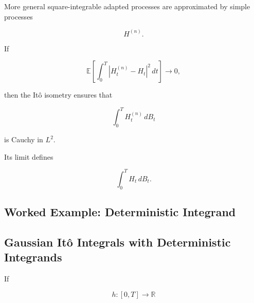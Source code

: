 More general square-integrable adapted processes are approximated by
simple processes

\[
H^{(n)}.
\]

If

\[
\mathbb{E}
\left[
\int_0^T
|H_t^{(n)}-H_t|^2\,dt
\right]
\to0,
\]

then the It\^o isometry ensures that

\[
\int_0^T
H_t^{(n)}\,dB_t
\]

is Cauchy in \(L^2\).

Its limit defines

\[
\boxed{
\int_0^T
H_t\,dB_t.
}
\]

\subsection{Worked Example: Deterministic Integrand}
\label{subsec:worked-deterministic-ito}


\subsection{Gaussian It\^o Integrals with Deterministic Integrands}
\label{subsec:gaussian-ito-deterministic}

If

\[
h:[0,T]\to\mathbb{R}
\]

